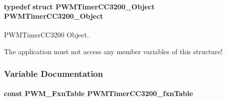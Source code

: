 \paragraph[{P\+W\+M\+Timer\+C\+C3200\+\_\+\+Object}]{\setlength{\rightskip}{0pt plus 5cm}typedef struct {\bf P\+W\+M\+Timer\+C\+C3200\+\_\+\+Object}  {\bf P\+W\+M\+Timer\+C\+C3200\+\_\+\+Object}}\label{_p_w_m_timer_c_c3200_8h_aab5de96f9cb61cd9fad8c91c02fb591a}


P\+W\+M\+Timer\+C\+C3200 Object. 

The application must not access any member variables of this structure! 

\subsubsection{Variable Documentation}
\paragraph[{P\+W\+M\+Timer\+C\+C3200\+\_\+fxn\+Table}]{\setlength{\rightskip}{0pt plus 5cm}const {\bf P\+W\+M\+\_\+\+Fxn\+Table} P\+W\+M\+Timer\+C\+C3200\+\_\+fxn\+Table}\label{_p_w_m_timer_c_c3200_8h_a59acce71ed10f39839edb1a310c6b385}
